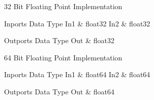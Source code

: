 32 Bit Floating Point Implementation

\begin{XtoCtabular}{Inports Data Type}
In1 & float32\tabularnewline
\hline
In2 & float32\tabularnewline
\hline
\end{XtoCtabular}

\begin{XtoCtabular}{Outports Data Type}
Out & float32\tabularnewline
\hline
\end{XtoCtabular}

\ifdefined \AddTestReports
{}
\fi
{}
\nopagebreak[0]

64 Bit Floating Point Implementation

\begin{XtoCtabular}{Inports Data Type}
In1 & float64\tabularnewline
\hline
In2 & float64\tabularnewline
\hline
\end{XtoCtabular}

\begin{XtoCtabular}{Outports Data Type}
Out & float64\tabularnewline
\hline
\end{XtoCtabular}

\ifdefined \AddTestReports
{}
\fi
